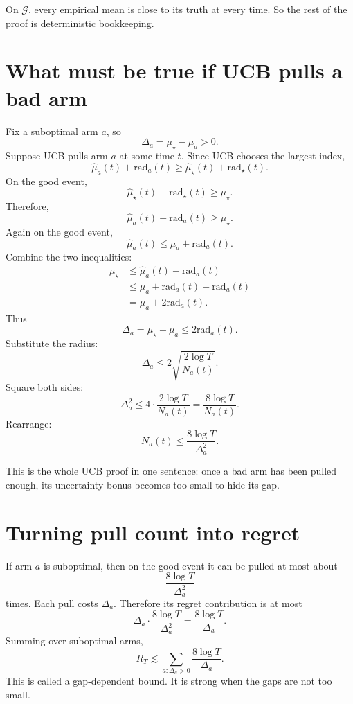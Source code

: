 \documentclass[en,nofont,11pt]{elegantbook}
\begin{document}
On $\mathcal{G}$, every empirical mean is close to its truth at every time.  So the rest of the proof is deterministic bookkeeping.

\section{What must be true if UCB pulls a bad arm}

Fix a suboptimal arm $a$, so
\[
\Delta_a=\mu_\star-\mu_a>0.
\]
Suppose UCB pulls arm $a$ at some time $t$.  Since UCB chooses the largest index,
\[
\widehat{\mu}_a(t)+\mathrm{rad}_a(t)
\ge
\widehat{\mu}_\star(t)+\mathrm{rad}_\star(t).
\]
On the good event,
\[
\widehat{\mu}_\star(t)+\mathrm{rad}_\star(t)
\ge
\mu_\star.
\]
Therefore,
\[
\widehat{\mu}_a(t)+\mathrm{rad}_a(t)
\ge
\mu_\star.
\]
Again on the good event,
\[
\widehat{\mu}_a(t)
\le
\mu_a+\mathrm{rad}_a(t).
\]
Combine the two inequalities:
\[
\begin{aligned}
\mu_\star
&\le
\widehat{\mu}_a(t)+\mathrm{rad}_a(t)\\
&\le
\mu_a+\mathrm{rad}_a(t)+\mathrm{rad}_a(t)\\
&=
\mu_a+2\mathrm{rad}_a(t).
\end{aligned}
\]
Thus
\[
\Delta_a
=
\mu_\star-\mu_a
\le
2\mathrm{rad}_a(t).
\]
Substitute the radius:
\[
\Delta_a
\le
2\sqrt{\frac{2\log T}{N_a(t)}}.
\]
Square both sides:
\[
\Delta_a^2
\le
4\cdot \frac{2\log T}{N_a(t)}
=
\frac{8\log T}{N_a(t)}.
\]
Rearrange:
\[
N_a(t)
\le
\frac{8\log T}{\Delta_a^2}.
\]

\begin{idea}
This is the whole UCB proof in one sentence: once a bad arm has been pulled enough, its uncertainty bonus becomes too small to hide its gap.
\end{idea}

\section{Turning pull count into regret}

If arm $a$ is suboptimal, then on the good event it can be pulled at most about
\[
\frac{8\log T}{\Delta_a^2}
\]
times.  Each pull costs $\Delta_a$.  Therefore its regret contribution is at most
\[
\Delta_a\cdot \frac{8\log T}{\Delta_a^2}
=
\frac{8\log T}{\Delta_a}.
\]
Summing over suboptimal arms,
\[
\boxed{
R_T
\lesssim
\sum_{a:\Delta_a>0}
\frac{8\log T}{\Delta_a}.
}
\]
This is called a gap-dependent bound.  It is strong when the gaps are not too small.
\end{document}
